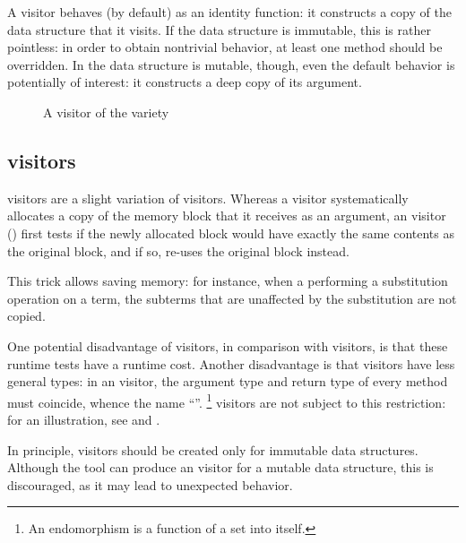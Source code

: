 \documentclass[11pt,a4paper,twoside]{article}
\begin{document}
A \map visitor behaves (by default) as an identity function: it constructs a
copy of the data structure that it visits. If the data structure is immutable,
this is rather pointless: in order to obtain nontrivial behavior, at least one
method should be overridden. In the data structure is mutable, though, even
the default behavior is potentially of interest: it constructs a deep copy of
its argument.


\begin{figure}[p]
\vspace{-\baselineskip}
\caption{A visitor of the \mapendo variety}
\label{fig:expr00endo}
\end{figure}

\subsection{\mapendo visitors}
\label{sec:intro:endo}

\mapendo visitors are a slight variation of \map visitors. Whereas a \map
visitor systematically allocates a copy of the memory block that it receives
as an argument, an \mapendo visitor () first tests if the
newly allocated block would have exactly the same contents as the original
block, and if so, re-uses the original block instead.

This trick allows saving memory: for instance, when a performing a
substitution operation on a term, the subterms that are unaffected
by the substitution are not copied.

One potential disadvantage of \mapendo visitors, in comparison with \map
visitors, is that these runtime tests have a runtime cost. Another
disadvantage is that \mapendo visitors have less general types: in an \mapendo
visitor, the argument type and return type of every method must coincide,
whence the name ``\mapendo''.%
%
\footnote{An endomorphism is a function of a set into itself.}
%
\map visitors are not subject to this restriction: for an illustration, see
 and .

In principle, \mapendo visitors should be created only for immutable data
structures. Although the tool can produce an \mapendo visitor for a mutable
data structure, this is discouraged, as it may lead to unexpected behavior.
\end{document}
